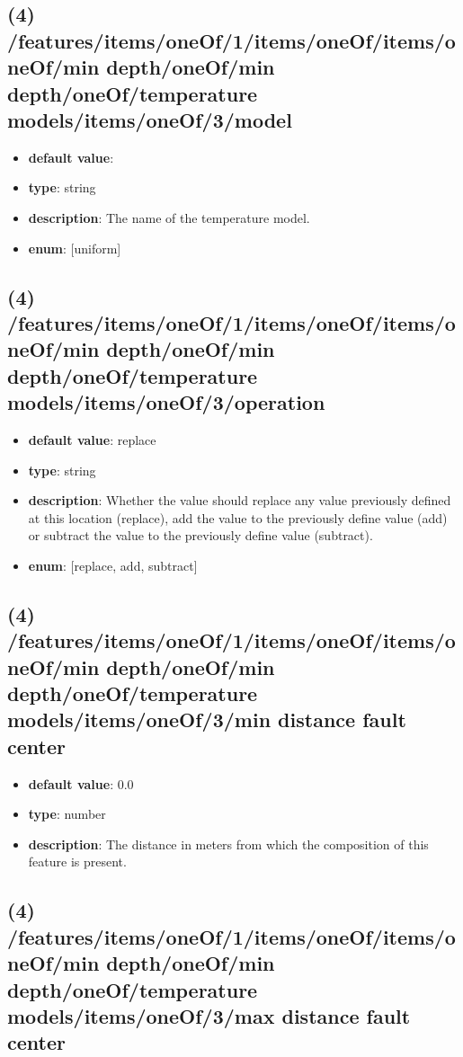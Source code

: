 \subsection{(4) /features/items/oneOf/1/items/oneOf/items/oneOf/min depth/oneOf/min depth/oneOf/temperature models/items/oneOf/3/model}
\begin{itemize}[leftmargin=4em]\item {\bf default value}: 
\item {\bf type}: string
\item {\bf description}: The name of the temperature model.
\item {\bf enum}: [uniform]\end{itemize}\subsection{(4) /features/items/oneOf/1/items/oneOf/items/oneOf/min depth/oneOf/min depth/oneOf/temperature models/items/oneOf/3/operation}
\begin{itemize}[leftmargin=4em]\item {\bf default value}: replace
\item {\bf type}: string
\item {\bf description}: Whether the value should replace any value previously defined at this location (replace), add the value to the previously define value (add) or subtract the value to the previously define value (subtract).
\item {\bf enum}: [replace, add, subtract]\end{itemize}\subsection{(4) /features/items/oneOf/1/items/oneOf/items/oneOf/min depth/oneOf/min depth/oneOf/temperature models/items/oneOf/3/min distance fault center}
\begin{itemize}[leftmargin=4em]\item {\bf default value}: 0.0
\item {\bf type}: number
\item {\bf description}: The distance in meters from which the composition of this feature is present.
\end{itemize}\subsection{(4) /features/items/oneOf/1/items/oneOf/items/oneOf/min depth/oneOf/min depth/oneOf/temperature models/items/oneOf/3/max distance fault center}
